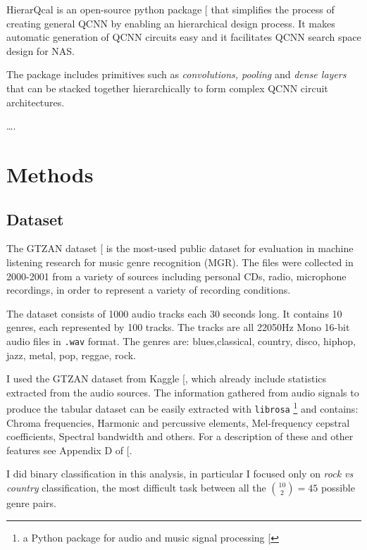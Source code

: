 \documentclass[
  13pt,
  a4paper,
  DIV=11,
  numbers=noendperiod]{scrreprt}
\begin{document}
HierarQcal is an open-source python package
{[}\citeproc{ref-github_hierarqcal}{6}{]} that simplifies the process of
creating general QCNN by enabling an hierarchical design process. It
makes automatic generation of QCNN circuits easy and it facilitates QCNN
search space design for NAS.

The package includes primitives such as \emph{convolutions, pooling} and
\emph{dense layers} that can be stacked together hierarchically to form
complex QCNN circuit architectures.

\ldots.


\chapter{Methods}\label{methods}

\section{Dataset}\label{dataset}

The GTZAN dataset
{[}\citeproc{ref-gtzan_tzanetakis_essl_cook_2001}{7}{]} is the most-used
public dataset for evaluation in machine listening research for music
genre recognition (MGR). The files were collected in 2000-2001 from a
variety of sources including personal CDs, radio, microphone recordings,
in order to represent a variety of recording conditions.

The dataset consists of 1000 audio tracks each 30 seconds long. It
contains 10 genres, each represented by 100 tracks. The tracks are all
22050Hz Mono 16-bit audio files in \texttt{.wav} format. The genres are:
blues,classical, country, disco, hiphop, jazz, metal, pop, reggae, rock.

I used the GTZAN dataset from Kaggle
{[}\citeproc{ref-GTZAN_kaggle}{8}{]}, which already include statistics
extracted from the audio sources. The information gathered from audio
signals to produce the tabular dataset can be easily extracted with
\texttt{librosa} \footnote{a Python package for audio and music signal
  processing {[}\citeproc{ref-mcfee2015librosa}{9}{]}} and contains:
Chroma frequencies, Harmonic and percussive elements, Mel-frequency
cepstral coefficients, Spectral bandwidth and others. For a description
of these and other features see Appendix D of
{[}\citeproc{ref-lourens2023hierarchical}{1}{]}.

I did binary classification in this analysis, in particular I focused
only on \emph{rock vs country} classification, the most difficult task
between all the \(\binom{10}{2} = 45\) possible genre pairs.
\end{document}
